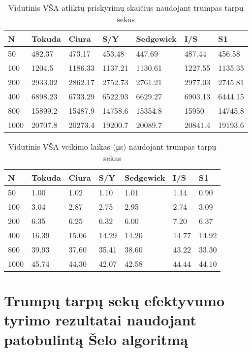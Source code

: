 \documentclass{VUMIFInfKursinis}
\begin{document}
\begin{table}[H]
  \caption{Vidutinis VŠA atliktų priskyrimų skaičius naudojant trumpas tarpų sekas}
  \label{tss_small_assignments}
  \begin{tabular}{|l|l|l|l|l|l|l|}
  \hline
  N    & Tokuda  & Ciura   & S/Y     & Sedgewick & I/S     & S1      \\ \hline
  50   & 482.37  & 473.17  & 453.48  & 447.69    & 487.44  & 456.58  \\ \hline
  100  & 1204.5  & 1186.33 & 1137.21 & 1130.61   & 1227.55 & 1135.35 \\ \hline
  200  & 2933.02 & 2862.17 & 2752.73 & 2761.21   & 2977.03 & 2745.81 \\ \hline
  400  & 6898.23 & 6733.29 & 6522.93 & 6629.27   & 6903.13 & 6444.15 \\ \hline
  800  & 15899.2 & 15487.9 & 14758.6 & 15354.8   & 15950   & 14745.8 \\ \hline
  1000 & 20707.8 & 20273.4 & 19200.7 & 20089.7   & 20841.4 & 19193.6 \\ \hline
  \end{tabular}
  \end{table}

\begin{table}[H]
  \caption{Vidutinis VŠA veikimo laikas (μs) naudojant trumpas tarpų sekas}
  \label{tss_small_runtimes}
  \begin{tabular}{|l|l|l|l|l|l|l|}
  \hline
  N    & Tokuda & Ciura & S/Y   & Sedgewick & I/S   & S1    \\ \hline
  50   & 1.00   & 1.02  & 1.10  & 1.01      & 1.14  & 0.90  \\ \hline
  100  & 3.04   & 2.87  & 2.75  & 2.95      & 2.74  & 3.09  \\ \hline
  200  & 6.35   & 6.25  & 6.32  & 6.00      & 7.20  & 6.37  \\ \hline
  400  & 16.39  & 15.06 & 14.29 & 14.20     & 14.77 & 14.92 \\ \hline
  800  & 39.93  & 37.60 & 35.41 & 38.60     & 43.22 & 33.30 \\ \hline
  1000 & 45.74  & 44.30 & 42.07 & 42.58     & 44.44 & 44.10 \\ \hline
  \end{tabular}
  \end{table}

\section{Trumpų tarpų sekų efektyvumo tyrimo rezultatai naudojant patobulintą Šelo algoritmą}
\end{document}
